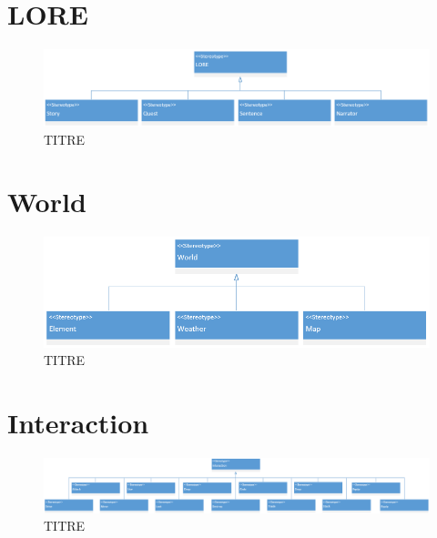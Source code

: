 \section*{LORE} 
\begin{figure}[H]
    \centering
    \includegraphics[width=14cm]{10_img/chap5/04_00_lore.PNG} 
    \caption{TITRE}
\end{figure}


\section*{World}
\begin{figure}[H]
    \centering
    \includegraphics[width=14cm]{10_img/chap5/05_00_world.PNG} 
    \caption{TITRE}
\end{figure}


\section*{Interaction}
\begin{figure}[H]
    \centering
    \includegraphics[width=14cm]{10_img/chap5/06_00_interaction.PNG} 
    \caption{TITRE}
\end{figure}